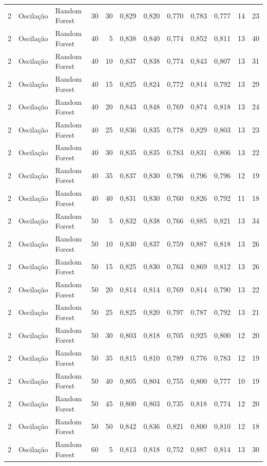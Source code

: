 \begin{longtable}{@{}rllrrrrrrrrr@{}}
2 & Oscilação & Random Forest & 30 & 30 & 0,829 & 0,820 & 0,770 & 0,783 & 0,777 & 14 & 23 \\
2 & Oscilação & Random Forest & 40 & 5 & 0,838 & 0,840 & 0,774 & 0,852 & 0,811 & 13 & 40 \\
2 & Oscilação & Random Forest & 40 & 10 & 0,837 & 0,838 & 0,774 & 0,843 & 0,807 & 13 & 31 \\
2 & Oscilação & Random Forest & 40 & 15 & 0,825 & 0,824 & 0,772 & 0,814 & 0,792 & 13 & 29 \\
2 & Oscilação & Random Forest & 40 & 20 & 0,843 & 0,848 & 0,769 & 0,874 & 0,818 & 13 & 24 \\
2 & Oscilação & Random Forest & 40 & 25 & 0,836 & 0,835 & 0,778 & 0,829 & 0,803 & 13 & 23 \\
2 & Oscilação & Random Forest & 40 & 30 & 0,835 & 0,835 & 0,783 & 0,831 & 0,806 & 13 & 22 \\
2 & Oscilação & Random Forest & 40 & 35 & 0,837 & 0,830 & 0,796 & 0,796 & 0,796 & 12 & 19 \\
2 & Oscilação & Random Forest & 40 & 40 & 0,831 & 0,830 & 0,760 & 0,826 & 0,792 & 11 & 18 \\
2 & Oscilação & Random Forest & 50 & 5 & 0,832 & 0,838 & 0,766 & 0,885 & 0,821 & 13 & 34 \\
2 & Oscilação & Random Forest & 50 & 10 & 0,830 & 0,837 & 0,759 & 0,887 & 0,818 & 13 & 26 \\
2 & Oscilação & Random Forest & 50 & 15 & 0,825 & 0,830 & 0,763 & 0,869 & 0,812 & 13 & 26 \\
2 & Oscilação & Random Forest & 50 & 20 & 0,814 & 0,814 & 0,769 & 0,814 & 0,790 & 13 & 22 \\
2 & Oscilação & Random Forest & 50 & 25 & 0,825 & 0,820 & 0,797 & 0,787 & 0,792 & 13 & 21 \\
2 & Oscilação & Random Forest & 50 & 30 & 0,803 & 0,818 & 0,705 & 0,925 & 0,800 & 12 & 20 \\
2 & Oscilação & Random Forest & 50 & 35 & 0,815 & 0,810 & 0,789 & 0,776 & 0,783 & 12 & 19 \\
2 & Oscilação & Random Forest & 50 & 40 & 0,805 & 0,804 & 0,755 & 0,800 & 0,777 & 10 & 19 \\
2 & Oscilação & Random Forest & 50 & 45 & 0,800 & 0,803 & 0,735 & 0,818 & 0,774 & 12 & 20 \\
2 & Oscilação & Random Forest & 50 & 50 & 0,842 & 0,836 & 0,821 & 0,800 & 0,810 & 12 & 18 \\
2 & Oscilação & Random Forest & 60 & 5 & 0,813 & 0,818 & 0,752 & 0,887 & 0,814 & 13 & 30 \\

\end{longtable}

